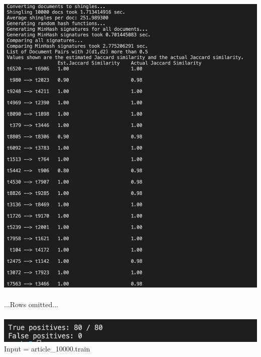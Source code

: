 \documentclass[9pt,twoside]{exam}
\begin{document}
\begin{center}
\includegraphics[scale=0.7]{10000-1.png}\\\\
...Rows omitted...\\\\
\includegraphics[scale=0.7]{10000-2.png}\\
Input = article\_10000.train \\

\end{center}
\end{document}

